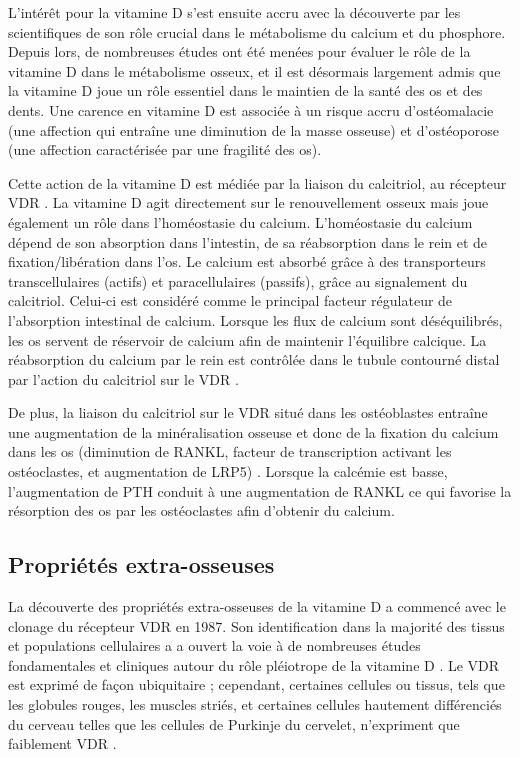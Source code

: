 \documentclass[
  a4paper,
  DIV=11,
  numbers=noendperiod,
  listof=totoc]{scrreprt}
\begin{document}
L'intérêt pour la vitamine D s'est ensuite accru avec la découverte par
les scientifiques de son rôle crucial dans le métabolisme du calcium et
du phosphore. Depuis lors, de nombreuses études ont été menées pour
évaluer le rôle de la vitamine D dans le métabolisme osseux, et il est
désormais largement admis que la vitamine D joue un rôle essentiel dans
le maintien de la santé des os et des dents. Une carence en vitamine D
est associée à un risque accru d'ostéomalacie (une affection qui
entraîne une diminution de la masse osseuse) et d'ostéoporose (une
affection caractérisée par une fragilité des os).

Cette action de la vitamine D est médiée par la liaison du calcitriol,
au récepteur \ac{VDR} \autocite{Norman.2008,Dankers.2017}. La vitamine D
agit directement sur le renouvellement osseux mais joue également un
rôle dans l'homéostasie du calcium. L'homéostasie du calcium dépend de
son absorption dans l'intestin, de sa réabsorption dans le rein et de
fixation/libération dans l'os. Le calcium est absorbé grâce à des
transporteurs transcellulaires (actifs) et paracellulaires (passifs),
grâce au signalement du calcitriol. Celui-ci est considéré comme le
principal facteur régulateur de l'absorption intestinal de calcium.
Lorsque les flux de calcium sont déséquilibrés, les os servent de
réservoir de calcium afin de maintenir l'équilibre calcique. La
réabsorption du calcium par le rein est contrôlée dans le tubule
contourné distal par l'action du calcitriol sur le \ac{VDR}
\autocite{Carmeliet.2015}.

De plus, la liaison du calcitriol sur le VDR situé dans les ostéoblastes
entraîne une augmentation de la minéralisation osseuse et donc de la
fixation du calcium dans les os (diminution de RANKL, facteur de
transcription activant les ostéoclastes, et augmentation de LRP5)
\autocite{Carmeliet.2015}. Lorsque la calcémie est basse, l'augmentation
de \ac{PTH} conduit à une augmentation de RANKL ce qui favorise la
résorption des os par les ostéoclastes afin d'obtenir du calcium.

\hypertarget{propriuxe9tuxe9s-extra-osseuses}{%
\subsection{Propriétés
extra-osseuses}\label{propriuxe9tuxe9s-extra-osseuses}}

La découverte des propriétés extra-osseuses de la vitamine D a commencé
avec le clonage du récepteur \ac{VDR} en 1987. Son identification dans
la majorité des tissus et populations cellulaires a a ouvert la voie à
de nombreuses études fondamentales et cliniques autour du rôle
pléiotrope de la vitamine D \autocite{Rosen.2012}. Le \ac{VDR} est
exprimé de façon ubiquitaire ; cependant, certaines cellules ou tissus,
tels que les globules rouges, les muscles striés, et certaines cellules
hautement différenciés du cerveau telles que les cellules de Purkinje du
cervelet, n'expriment que faiblement \ac{VDR} \autocite{Bouillon.2008}.
\end{document}
